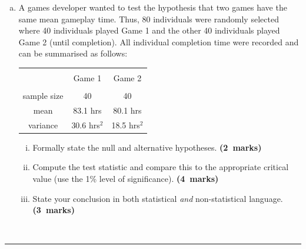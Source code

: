 \documentclass[12pt]{article}
\begin{document}
\begin{enumerate}[a)]
\begin{enumerate}[i)]
    \end{enumerate}
    \begin{center}\noindent\rule{0.4\linewidth}{0.5pt}\end{center}
\item A games developer wanted to test the hypothesis that two games have the same mean gameplay time. Thus, 80 individuals were randomly selected where 40 individuals played Game 1 and the other 40 individuals played Game 2 (until completion). All individual completion time were recorded and can be summarised as follows:
\begin{small}
\begin{center}
\begin{tabular}{|c|c|c|}
\hline
&&\\[-0.3cm]
& Game 1 & Game 2 \\
\hline
&&\\[-0.2cm]
sample size      & 40              & 40 \\[0.2cm]
mean             & 83.1\,\,hrs     & 80.1\,\,hrs \\[0.2cm]
variance         &  30.6\,\,hrs$^2$ & 18.5\,\,hrs$^2$ \\[0.2cm]
\hline
\end{tabular}
\end{center}
\end{small}
\begin{enumerate}[i)]\itemsep0.3cm
\item Formally state the null and alternative hypotheses. \hfill{\mbox{\scriptsize \bf (2 marks)}}
\item Compute the test statistic and compare this to the appropriate critical value (use the 1\% level of significance). \hfill{\mbox{\scriptsize \bf (4 marks)}}
\item State your conclusion in both statistical \emph{and} non-statistical language.\\ \phantom{a} \hfill{\mbox{\scriptsize \bf (3 marks)}}
\end{enumerate}
\end{enumerate}
\quad\\[-0.3cm]
\noindent\rule{\linewidth}{1pt}

\newpage
\end{document}
